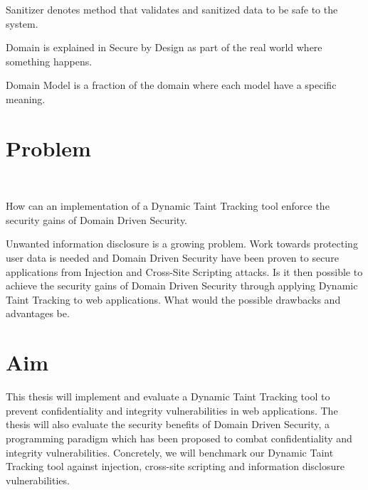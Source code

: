 \begin{definition}{Sanitizer}
	denotes method that validates and sanitized data to be safe to the system.
	\\
\end{definition}

\begin{definition}{Domain}
	is explained in Secure by Design \parencite{sbd2018} as part of the real world where something happens.
	\\
\end{definition}

\begin{definition}{Domain Model}
	is a fraction of the domain where each model have a specific meaning.
	\\
\end{definition}


\section{Problem}
\label{Problem}
\hfill \\
\begin{chapquote}{}
	How can an implementation of a Dynamic Taint Tracking tool enforce the security gains of Domain Driven Security.
\end{chapquote}

\noindent
Unwanted information disclosure is a growing problem. Work towards protecting user data is needed and Domain Driven Security have been proven to secure applications from Injection and Cross-Site Scripting attacks. Is it then possible to achieve the security gains of Domain Driven Security through applying Dynamic Taint Tracking to web applications. What would the possible drawbacks and advantages be.


\section{Aim}
\label{Aim}
This thesis will implement and evaluate a Dynamic Taint Tracking tool to prevent confidentiality and integrity vulnerabilities in web applications. The thesis will also evaluate the security benefits of Domain Driven Security, a programming paradigm which has been proposed to combat confidentiality and integrity vulnerabilities. Concretely, we will benchmark our Dynamic Taint Tracking tool against injection, cross-site scripting and information disclosure vulnerabilities.


